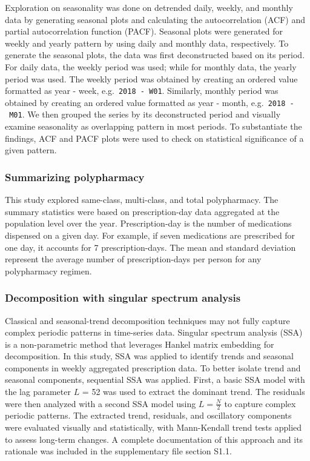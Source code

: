 \documentclass[
  authoryear,
  review]{elsarticle}
\begin{document}
Exploration on seasonality was done on detrended daily, weekly, and
monthly data by generating seasonal plots and calculating the
autocorrelation (ACF) and partial autocorrelation function (PACF).
Seasonal plots were generated for weekly and yearly pattern by using
daily and monthly data, respectively. To generate the seasonal plots,
the data was first deconstructed based on its period. For daily data,
the weekly period was used; while for monthly data, the yearly period
was used. The weekly period was obtained by creating an ordered value
formatted as year - week, e.g.~\texttt{2018\ -\ W01}. Similarly, monthly
period was obtained by creating an ordered value formatted as year -
month, e.g.~\texttt{2018\ -\ M01}. We then grouped the series by its
deconstructed period and visually examine seasonality as overlapping
pattern in most periods. To substantiate the findings, ACF and PACF
plots were used to check on statistical significance of a given pattern.

\subsubsection{Summarizing polypharmacy}\label{summarizing-polypharmacy}

This study explored same-class, multi-class, and total polypharmacy. The
summary statistics were based on prescription-day data aggregated at the
population level over the year. Prescription-day is the number of
medications dispensed on a given day. For example, if seven medications
are prescribed for one day, it accounts for 7 prescription-days. The
mean and standard deviation represent the average number of
prescription-days per person for any polypharmacy regimen.

\subsubsection{Decomposition with singular spectrum
analysis}\label{decomposition-with-singular-spectrum-analysis}

Classical and seasonal-trend decomposition techniques may not fully
capture complex periodic patterns in time-series data. Singular spectrum
analysis (SSA) is a non-parametric method that leverages Hankel matrix
embedding for decomposition. In this study, SSA was applied to identify
trends and seasonal components in weekly aggregated prescription data.
To better isolate trend and seasonal components, sequential SSA was
applied. First, a basic SSA model with the lag parameter \(L\) = 52 was
used to extract the dominant trend. The residuals were then analyzed
with a second SSA model using \(L = \frac{N}{2}\) to capture complex
periodic patterns. The extracted trend, residuals, and oscillatory
components were evaluated visually and statistically, with Mann-Kendall
trend tests applied to assess long-term changes. A complete
documentation of this approach and its rationale was included in the
supplementary file section S1.1.
\end{document}
